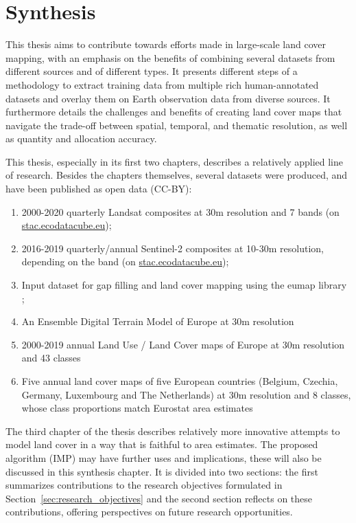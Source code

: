 \chapter[Synthesis]{Synthesis}
\label{cha:Chapter6}
\newpage

This thesis aims to contribute towards efforts made in large-scale land cover mapping, with an emphasis on the benefits of combining several datasets from different sources and of different types. It presents different steps of a methodology to extract training data from multiple rich human-annotated datasets and overlay them on Earth observation data from diverse sources. It furthermore details the challenges and benefits of creating land cover maps that navigate the trade-off between spatial, temporal, and thematic resolution, as well as quantity and allocation accuracy.

This thesis, especially in its first two chapters, describes a relatively applied line of research. Besides the chapters themselves, several datasets were produced, and have been published as open data (CC-BY):
\begin{enumerate}
    \item 2000-2020 quarterly Landsat composites at 30m resolution and 7 bands (on \url{stac.ecodatacube.eu});
    \item 2016-2019 quarterly/annual Sentinel-2 composites at 10-30m resolution, depending on the band (on \url{stac.ecodatacube.eu});
    \item Input dataset for gap filling and land cover mapping using the eumap library \citep{parente2020input};
    \item An Ensemble Digital Terrain Model of Europe at 30m resolution \citep{hengl2021continental}
    \item 2000-2019 annual Land Use / Land Cover maps of Europe at 30m resolution and 43 classes \citep{parente2021continental}
    \item Five annual land cover maps of five European countries (Belgium, Czechia, Germany, Luxembourg and The Netherlands) at 30m resolution and 8 classes, whose class proportions match Eurostat area estimates \citep{witjes2024iterative}
\end{enumerate}
The third chapter of the thesis describes relatively more innovative attempts to model land cover in a way that is faithful to area estimates. The proposed algorithm (IMP) may have further uses and implications, these will also be discussed in this synthesis chapter. It is divided into two sections: the first summarizes contributions to the research objectives formulated in Section~\ref{sec:research_objectives} and the second section reflects on these contributions, offering perspectives on future research opportunities. 

